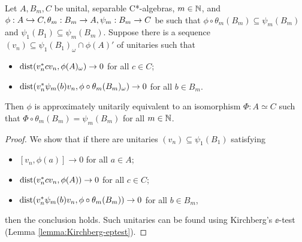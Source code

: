 \documentclass[12pt]{amsart}
\begin{document}
    \begin{prop}\label{countablerelativeintertwining}
        Let $A,B_m,C$ be unital, separable C*-algebras, $m \in \mathbb{N}$, and $\phi: A \hookrightarrow C,\theta_m: B_m \to A,\psi_m: B_m \to C$ be such that $\phi \circ \theta_m(B_m) \subseteq \psi_m(B_m)$ and $\psi_1(B_1) \subseteq \psi_m(B_m)$. Suppose there is a sequence $(v_n) \subseteq \psi_1(B_1)_\omega \cap \phi(A)'$ of unitaries such that
          \begin{itemize}
            \item $\text{dist}(v_n^*cv_n,\phi(A)_\omega) \to 0$ for all $c \in C$;
            \item $\text{dist}(v_n^*\psi_m(b)v_n,\phi \circ \theta_m(B_m)_\omega) \to 0$ for all $b \in B_m$. 
          \end{itemize}
          Then $\phi$ is approximately unitarily equivalent to an isomorphism $\Phi:A \simeq C$ such that $\Phi \circ \theta_m (B_m) = \psi_m(B_m)$ for all $m \in \mathbb{N}$. 
            \begin{proof}
              We show that if there are unitaries $(v_n) \subseteq \psi_1(B_1)$ satisfying
                \begin{itemize}
                  \item $[v_n,\phi(a)] \to 0$ for all $a \in A$;
                  \item $\text{dist}(v_n^*cv_n,\phi(A)) \to 0$ for all $c \in C$;
                  \item $\text{dist}(v_n^*\psi_m(b)v_n,\phi \circ \theta_m(B_m)) \to 0$ for all $b \in B_m$,
                \end{itemize}
                then the conclusion holds. Such unitaries can be found using Kirchberg's $\ee$-test (Lemma \ref{lemma:Kirchberg-eptest}).


\end{proof}
\end{prop}
\end{document}
